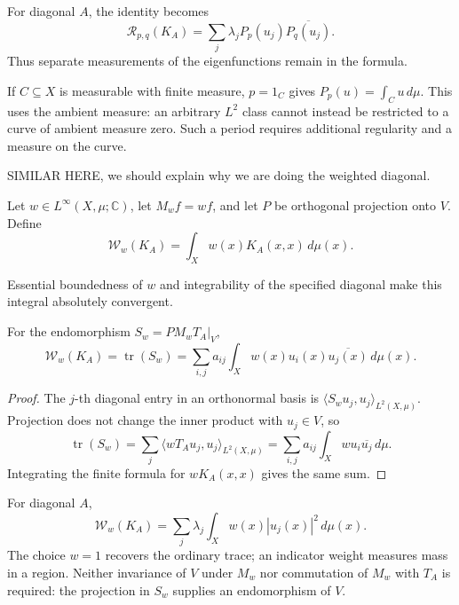 For diagonal $A$, the identity becomes
\[
\mathcal R_{p,q}(K_A)
=\sum_j\lambda_jP_p(u_j)\overline{P_q(u_j)}.
\]
Thus separate measurements of the eigenfunctions remain in the formula.

\begin{remark}\label{finite-subset-periods}
If $C\subseteq X$ is measurable with finite measure, $p=1_C$ gives $P_p(u)=\int_Cu\,d\mu$. This uses the ambient measure: an arbitrary $L^2$ class cannot instead be restricted to a curve of ambient measure zero. Such a period requires additional regularity and a measure on the curve.
\end{remark}

SIMILAR HERE, we should explain why we are doing the weighted diagonal. 

\begin{definition}\label{weighted-finite-trace}

Let $w\in L^\infty(X,\mu;\mathbb C)$, let $M_wf=wf$, and let $P$ be orthogonal projection onto $V$. Define
\[
\mathcal W_w(K_A)=\int_Xw(x)K_A(x,x)\,d\mu(x).
\]
\end{definition}

Essential boundedness of $w$ and integrability of the specified diagonal make this integral absolutely convergent.

\begin{proposition}\label{finite-weighted-kernel-identity}
For the endomorphism $S_w=P M_wT_A|_V$,
\[
\mathcal W_w(K_A)=\operatorname{tr}(S_w)
=\sum_{i,j}a_{ij}\int_Xw(x)u_i(x)\overline{u_j(x)}\,d\mu(x).
\]
\end{proposition}

\begin{proof}
The $j$-th diagonal entry in an orthonormal basis is $\langle S_wu_j,u_j\rangle_{L^2(X,\mu)}$. Projection does not change the inner product with $u_j\in V$, so
\[
\operatorname{tr}(S_w)
=\sum_j\langle wT_Au_j,u_j\rangle_{L^2(X,\mu)}
=\sum_{i,j}a_{ij}\int_Xwu_i\overline{u_j}\,d\mu.
\]
Integrating the finite formula for $wK_A(x,x)$ gives the same sum.
\end{proof}

For diagonal $A$,
\[
\mathcal W_w(K_A)=\sum_j\lambda_j\int_Xw(x)|u_j(x)|^2\,d\mu(x).
\]
The choice $w=1$ recovers the ordinary trace; an indicator weight measures mass in a region. Neither invariance of $V$ under $M_w$ nor commutation of $M_w$ with $T_A$ is required: the projection in $S_w$ supplies an endomorphism of $V$.

